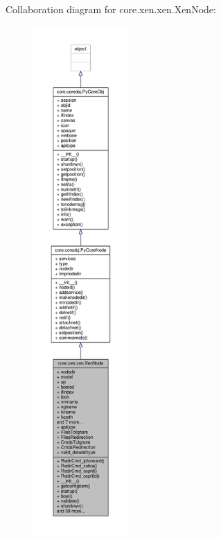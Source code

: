Collaboration diagram for core.\+xen.\+xen.\+Xen\+Node\+:
\nopagebreak
\begin{figure}[H]
\begin{center}
\leavevmode
\includegraphics[height=550pt]{classcore_1_1xen_1_1xen_1_1_xen_node__coll__graph}
\end{center}
\end{figure}
